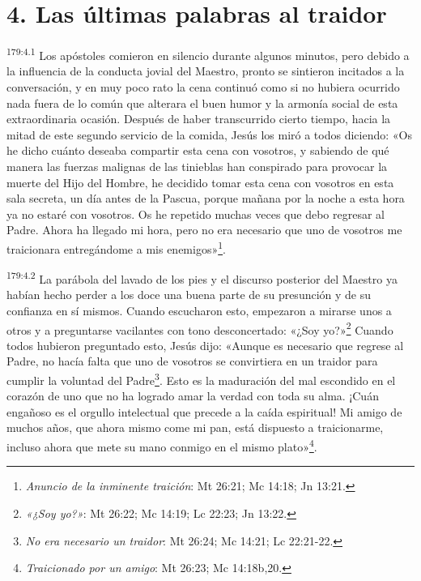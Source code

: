 \section*{4. Las últimas palabras al traidor}
\par
\textsuperscript{179:4.1} Los apóstoles comieron en silencio durante algunos minutos, pero debido a la influencia de la conducta jovial del Maestro, pronto se sintieron incitados a la conversación, y en muy poco rato la cena continuó como si no hubiera ocurrido nada fuera de lo común que alterara el buen humor y la armonía social de esta extraordinaria ocasión. Después de haber transcurrido cierto tiempo, hacia la mitad de este segundo servicio de la comida, Jesús los miró a todos diciendo: «Os he dicho cuánto deseaba compartir esta cena con vosotros, y sabiendo de qué manera las fuerzas malignas de las tinieblas han conspirado para provocar la muerte del Hijo del Hombre, he decidido tomar esta cena con vosotros en esta sala secreta, un día antes de la Pascua, porque mañana por la noche a esta hora ya no estaré con vosotros. Os he repetido muchas veces que debo regresar al Padre. Ahora ha llegado mi hora, pero no era necesario que uno de vosotros me traicionara entregándome a mis enemigos»\footnote{\textit{Anuncio de la inminente traición}: Mt 26:21; Mc 14:18; Jn 13:21.}.

\par
\textsuperscript{179:4.2} La parábola del lavado de los pies y el discurso posterior del Maestro ya habían hecho perder a los doce una buena parte de su presunción y de su confianza en sí mismos. Cuando escucharon esto, empezaron a mirarse unos a otros y a preguntarse vacilantes con tono desconcertado: «¿Soy yo?»\footnote{\textit{«¿Soy yo?»}: Mt 26:22; Mc 14:19; Lc 22:23; Jn 13:22.} Cuando todos hubieron preguntado esto, Jesús dijo: «Aunque es necesario que regrese al Padre, no hacía falta que uno de vosotros se convirtiera en un traidor para cumplir la voluntad del Padre\footnote{\textit{No era necesario un traidor}: Mt 26:24; Mc 14:21; Lc 22:21-22.}. Esto es la maduración del mal escondido en el corazón de uno que no ha logrado amar la verdad con toda su alma. ¡Cuán engañoso es el orgullo intelectual que precede a la caída espiritual! Mi amigo de muchos años, que ahora mismo come mi pan, está dispuesto a traicionarme, incluso ahora que mete su mano conmigo en el mismo plato»\footnote{\textit{Traicionado por un amigo}: Mt 26:23; Mc 14:18b,20.}.

